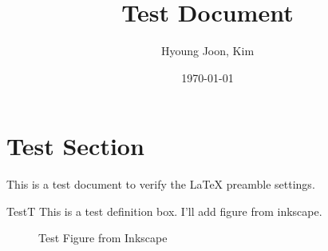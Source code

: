 \documentclass{article}
\title{Test Document}
\author{Hyoung Joon, Kim}
\date{\today}
\begin{document}
\maketitle
\tableofcontents
\newpage

\section{Test Section}
This is a test document to verify the LaTeX preamble settings.

\begin{defn}{Test}{T}
    This is a test definition box.
    I'll add figure from inkscape. 
\end{defn}

\begin{figure}[ht]
    \centering
    \caption{Test Figure from Inkscape}
    \label{fig:test}
\end{figure}
\end{document}
